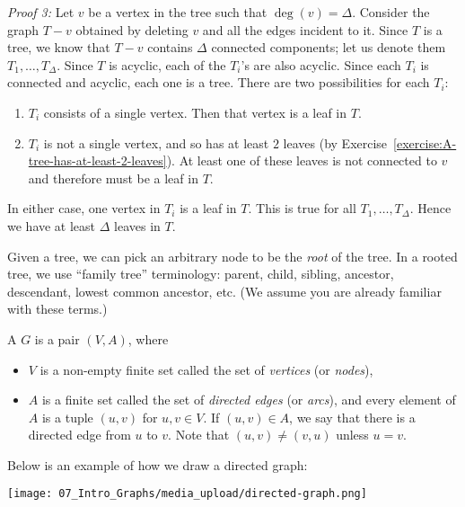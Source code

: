 \begin{flex}
\begin{solution}
\noindent
\emph{Proof 3:} Let $v$ be a vertex in the tree such that $\deg(v) = \Delta.$ Consider the graph $T - v$ obtained by deleting $v$ and all the edges incident to it. Since $T$ is a tree, we know that $T-v$ contains $\Delta$ connected components; let us denote them $T_1,\ldots, T_{\Delta}$.  Since $T$ is acyclic, each of the $T_i$'s are also acyclic. Since each $T_i$ is connected and acyclic, each one is a tree. There are two possibilities for each $T_i$:
\begin{enumerate}
    \item $T_i$ consists of a single vertex. Then that vertex is a leaf in $T$.
    \item $T_i$ is not a single vertex, and so has at least $2$ leaves (by Exercise~\ref{exercise:A-tree-has-at-least-2-leaves}). At least one of these leaves is not connected to $v$ and therefore must be a leaf in $T$.
\end{enumerate} 
In either case, one vertex in $T_i$ is a leaf in $T$. This is true for all $T_1, \ldots, T_{\Delta}$. Hence we have at least $\Delta$ leaves in $T$.
\end{solution}
\end{flex}


\begin{note} \label{note:Root-parent-child-sibling-etc}
Given a tree, we can pick an arbitrary node to be the \emph{root} of the tree. In a rooted tree, we use ``family tree'' terminology: parent, child, sibling, ancestor, descendant, lowest common ancestor, etc. (We assume you are already familiar with these terms.)
\end{note}


\begin{definition} \label{definition:Directed-graph}
A  $G$ is a pair $(V,A)$, where 
\begin{itemize}
    \item $V$ is a non-empty finite set called the set of \emph{vertices} (or \emph{nodes}),
    \item $A$ is a finite set called the set of \emph{directed edges} (or \emph{arcs}), and every element of $A$ is a tuple $(u,v)$ for $u, v \in V$. If $(u,v) \in A$, we say that there is a directed edge from $u$ to $v$. Note that $(u,v) \neq (v,u)$ unless $u = v$.
\end{itemize}
\end{definition}


\begin{note} \label{note:Drawing-directed-graphs}
Below is an example of how we draw a directed graph:
\begin{center}
    \texttt{[image: 07\_Intro\_Graphs/media\_upload/directed-graph.png]}
\end{center}
\end{note}


